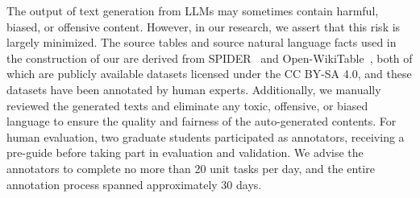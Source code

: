 The output of text generation from LLMs may sometimes contain harmful, biased, or offensive content.
However, in our research, we assert that this risk is largely minimized.
The source tables and source natural language facts used in the construction of our \bench are derived from SPIDER~\citep{Yu2018SpiderAL} and Open-WikiTable~\citep{Kweon2023OpenWikiTableDF}, both of which are publicly available datasets licensed under the CC BY-SA 4.0, and these datasets have been annotated by human experts.
Additionally, we manually reviewed the generated texts and eliminate any toxic, offensive, or biased language to ensure the quality and fairness of the auto-generated contents. 
For human evaluation, two graduate students participated as annotators, receiving a pre-guide before taking part in evaluation and validation.
We advise the annotators to complete no more than 20 unit tasks per day, and the entire annotation process spanned approximately 30 days.